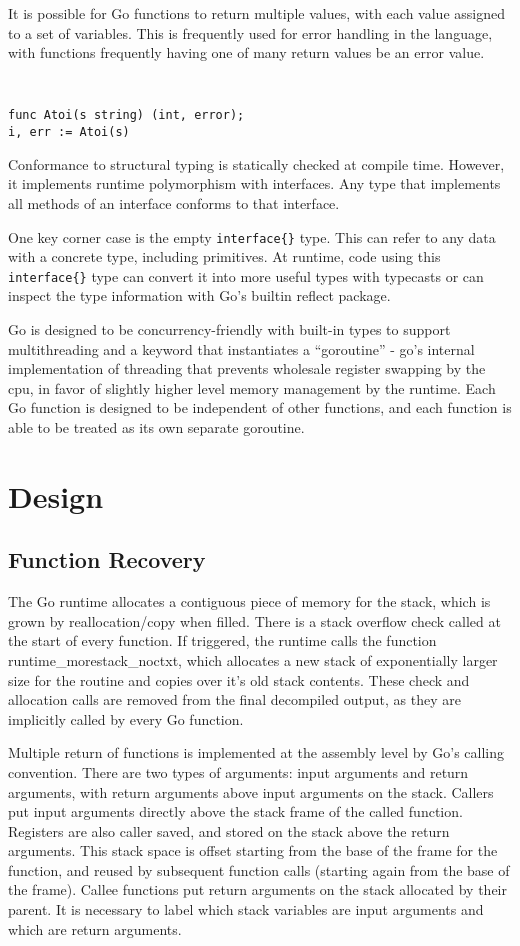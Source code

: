 \documentclass[letterpaper,twocolumn,10pt]{article}
\begin{document}
It is possible for Go functions to return multiple values, with each value assigned to a set of variables. This is frequently used for error handling in the language, with functions frequently having one of many return values be an error value.
{\tt \small
\begin{verbatim}
func Atoi(s string) (int, error);
i, err := Atoi(s)
\end{verbatim}
}

Conformance to structural typing is statically checked at compile time. However, it implements runtime polymorphism with interfaces. Any type that implements all methods of an interface conforms to that interface.

One key corner case is the empty \texttt{interface\{\}} type. This can refer to any data with a concrete type, including primitives. At runtime, code using this \texttt{interface\{\}} type can convert it into more useful types with typecasts or can inspect the type information with Go’s builtin reflect package.

Go is designed to be concurrency-friendly with built-in types to support multithreading and a keyword that instantiates a “goroutine” - go’s internal implementation of threading that prevents wholesale register swapping by the cpu, in favor of slightly higher level memory management by the runtime. Each Go function is designed to be independent of other functions, and each function is able to be treated as its own separate goroutine.

\section{Design}
\subsection{Function Recovery}
The Go runtime allocates a contiguous piece of memory for the stack, which is grown by reallocation/copy when filled. There is a stack overflow check called at the start of every function. If triggered, the runtime calls the function runtime\_morestack\_noctxt, which allocates a new stack of exponentially larger size for the routine and copies over it’s old stack contents. These check and allocation calls are removed from the final decompiled output, as they are implicitly called by every Go function.

Multiple return of functions is implemented at the assembly level by Go’s calling convention. There are two types of arguments: input arguments and return arguments, with return arguments above input arguments on the stack. Callers put input arguments directly above the stack frame of the called function. Registers are also caller saved, and stored on the stack above the return arguments. This stack space is offset starting from the base of the frame for the function, and reused by subsequent function calls (starting again from the base of the frame). Callee functions put return arguments on the stack allocated by their parent. It is necessary to label which stack variables are input arguments and which are return arguments.
\end{document}
